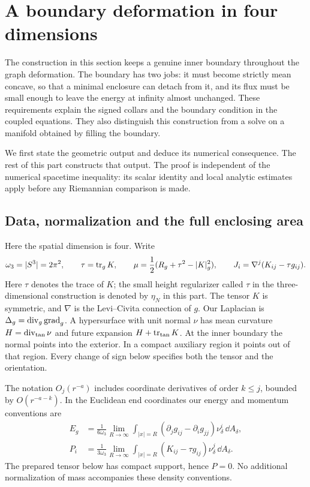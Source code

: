 \section{A boundary deformation in four dimensions}
\label{four:sec:output}

The construction in this section keeps a genuine inner boundary throughout
the graph deformation. The boundary has two jobs: it must become strictly
mean concave, so that a minimal enclosure can detach from it, and its flux
must be small enough to leave the energy at infinity almost unchanged.
These requirements explain the signed collars and the boundary condition
in the coupled equations. They also distinguish this construction from a
solve on a manifold obtained by filling the boundary.

We first state the geometric output and deduce its numerical consequence.
The rest of this part constructs that output. The proof is independent
of the numerical spacetime inequality: its scalar identity and local
analytic estimates apply before any Riemannian comparison is made.

\subsection{Data, normalization and the full enclosing area}

Here the spatial dimension is four. Write
\[
 \omega_3=|S^3|=2\pi^2,\qquad
 \tau=\operatorname{tr}_gK,\qquad
 \mu=\frac12(R_g+\tau^2-|K|_g^2),\qquad
 J_i=\nabla^j(K_{ij}-\tau g_{ij}).
\]
Here $\tau$ denotes the trace of $K$; the small height regularizer called
$\tau$ in the three-dimensional construction is denoted by $\eta_N$ in
this part. The tensor $K$ is symmetric, and $\nabla$ is the Levi--Civita
connection of $g$. Our Laplacian is $\Delta_g=\operatorname{div}_g\operatorname{grad}_g$. A hypersurface with
unit normal $\nu$ has mean curvature $H=\operatorname{div}_{\mathrm{tan}}\nu$ and
future expansion $H+\operatorname{tr}_{\mathrm{tan}}K$. At the inner boundary the
normal points into the exterior. In a compact auxiliary region it points
out of that region. Every change of sign below specifies both the tensor
and the orientation.

The notation $O_j(r^{-a})$ includes coordinate derivatives of order
$k\le j$, bounded by $O(r^{-a-k})$. In the Euclidean end coordinates our
energy and momentum conventions are
\begin{align}
 E_g&=\frac1{6\omega_3}\lim_{R\to\infty}
 \int_{|x|=R}(\partial_jg_{ij}-\partial_i g_{jj})
                \nu_\delta^i\,\dd A_\delta,
                   \label{four:intro:energy}\\
 P_i&=\frac1{3\omega_3}\lim_{R\to\infty}
 \int_{|x|=R}(K_{ij}-\tau g_{ij})\nu_\delta^j\,\dd A_\delta.
                   \label{four:intro:momentum}
\end{align}
The prepared tensor below has compact support, hence $P=0$. No additional
normalization of mass accompanies these density conventions.


